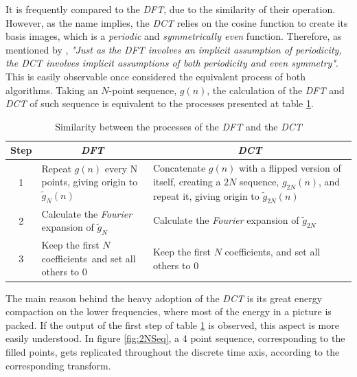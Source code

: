 It is frequently compared to the \emph{DFT}, due to the similarity of their operation. However, as the name implies, the \emph{DCT} relies on the cosine function to create its basis images, which is a \emph{periodic} and \emph{symmetrically even} function. Therefore, as mentioned by \cite[A. V. Oppenheim]{oppenheimDiscretetimeSignalProcessing1998}, \emph{"Just as the DFT involves an implicit assumption of periodicity, the DCT involves implicit assumptions of both periodicity and even symmetry"}.  This is easily observable once considered the equivalent process of both algorithms. Taking an $N$-point sequence, $g(n)$, the calculation of the \emph{DFT} and \emph{DCT} of such sequence is equivalent to the processes presented at table \ref{tab:DFTDCT}.

\begin{table}[!htpb]
    \centering
    \begin{tabular}{cllll@{}} \toprule
        \textbf{Step} &      \multicolumn{2}{c}{\textbf{\emph{DFT}}} &      \multicolumn{2}{c}{\textbf{\emph{DCT}}} \\ \toprule
        1 &         \multicolumn{2}{p{0.35\textwidth}}{Repeat $g(n)$ every N points, giving origin to $\widetilde{g}_N(n)$} &         \multicolumn{2}{p{0.35\textwidth}}{Concatenate $g(n)$ with a flipped version of itself, creating a $2N$ sequence, $g_{2N}(n)$, and repeat it, giving origin to $\widetilde{g}_{2N}(n)$}\\ 
        2 &         \multicolumn{2}{p{0.35\textwidth}}{Calculate the \emph{Fourier} expansion of $\widetilde{g}_N$} &         \multicolumn{2}{p{0.35\textwidth}}{Calculate the \emph{Fourier} expansion of $\widetilde{g}_{2N}$}\\ 
        3 &         \multicolumn{2}{p{0.35\textwidth}}{Keep the first $N$ coefficients\, and set all others to $0$} &         \multicolumn{2}{p{0.35\textwidth}}{Keep the first $N$ coefficients, and set all others to $0$}\\ 
        \bottomrule
    \end{tabular}
    \caption{Similarity between the processes of the        \emph{DFT} and the \emph{DCT}}
    \label{tab:DFTDCT}
\end{table}

The main reason behind the heavy adoption of the \emph{DCT} is its great energy compaction on the lower frequencies, where most of the energy in a picture is packed. If the output of the first step of table \ref{tab:DFTDCT} is observed, this aspect is more easily understood. In figure \ref{fig:2NSeq}, a 4 point sequence, corresponding to the filled points, gets replicated throughout the discrete time axis, according to the corresponding transform.

